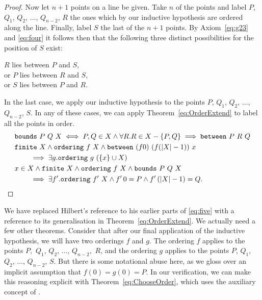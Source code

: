 \begin{proof}
Now let $n+1$ points on a line be given. Take $n$ of the points and label $P$, $Q_1$, $Q_2$, $\ldots$, $Q_{n-2}$, $R$ the ones which by our inductive hypothesis are ordered along the line. Finally, label $S$ the last of the $n+1$ points. By Axiom~\ref{eq:g23} and \ref{eq:four} it follows then that the following three distinct possibilities for the position of $S$ exist:

\vspace{0.5cm}
\noident $R$ lies between $P$ and $S$,\\
\noident or $P$ lies between $R$ and $S$,\\
\noident or $S$ lies between $P$ and $R$.
\vspace{0.5cm}

In the last case, we apply our inductive hypothesis to the points $P$, $Q_1$, $Q_2$, $\ldots$, $Q_{n-2}$, $S$. In any of these cases, we can apply Theorem~\ref{eq:OrderExtend} to label all the points in order.
\begin{align}
  \label{eq:BoundsDef}
  &\texttt{bounds}\ P\ Q\ X \iff P,Q \in X \wedge \forall R. R \in X - \{P,Q\} \implies \texttt{between}\ P\ R\ Q\\
  \label{eq:OrderExtend}
  &\texttt{finite}\ X \wedge \texttt{ordering}\ f\ X \wedge \texttt{between}\ (f 0)\ (f (|X| - 1))\ x\notag\\
  &\qquad \implies \exists g. \texttt{ordering}\ g\ (\{x\} \cup X)\\
  \label{eq:ChooseOrder}
  &x \in X \wedge \texttt{finite}\ X \wedge \texttt{ordering}\ f\ X \wedge \texttt{bounds}\ P\ Q\ X\notag\\
  &\qquad\implies\exists f'. \texttt{ordering}\ f'\ X \wedge f'\,0 = P \wedge f'\,(|X| - 1) = Q.
\end{align}

\end{proof}
We have replaced Hilbert's reference to his earlier parts of \ref{eq:five} with a reference to its generalisation in Theorem~\ref{eq:OrderExtend}. We actually need a few other theorems. Consider that after our final application of the inductive hypothesis, we will have two orderings $f$ and $g$. The ordering $f$ applies to the points $P,$ $Q_1$, $Q_2$, $\ldots$, $Q_{n-2},$ $R$, and the ordering $g$ applies to the points $P$, $Q_1$, $Q_2$, $\ldots$, $Q_{n-2}$, $S$. But  there is some notational abuse here, as we gloss over an implicit assumption that $f(0) = g(0) = P$. In our verification, we can make this reasoning explicit with Theorem~\ref{eq:ChooseOrder}, which uses the auxiliary concept of . 

